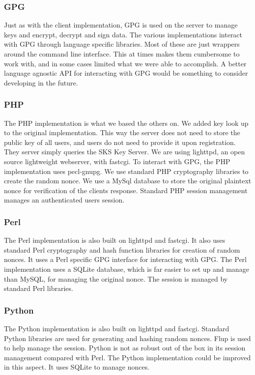 \documentclass[11pt]{article}
\begin{document}
\subsubsection{GPG}
Just as with the client implementation, GPG is used on the server to manage keys and encrypt, decrypt and sign data. The various implementations interact with GPG through language specific libraries. Most of these are just wrappers around the command line interface. This at times makes them cumbersome to work with, and in some cases limited what we were able to accomplish. A better language agnostic API for interacting with GPG would be something to consider developing in the future. 
\subsubsection{PHP}
The PHP implementation is what we based the others on. We added key look up to the original implementation. This way the server does not need to store the public key of all users, and users do not need to provide it upon registration. They server simply queries the SKS Key Server. We are using lighttpd, an open source lightweight webserver, with fastcgi. To interact with GPG, the PHP implementation uses pecl-gnupg. We use standard PHP cryptography libraries to create the random nonce. We use a MySql database to store the original plaintext nonce for verification of the clients response. Standard PHP session management manages an authenticated users session.
\subsubsection{Perl}
The Perl implementation is also built on lighttpd and fastcgi. It also uses standard Perl cryptography and hash function libraries for creation of random nonces. It uses a Perl specific GPG interface for interacting with GPG. The Perl implementation uses a SQLite database, which is far easier to set up and manage than MySQL, for managing the original nonce. The session is managed by standard Perl libraries.
\subsubsection{Python}
The Python implementation is also built on lighttpd and fastcgi. Standard Python libraries are used for generating and hashing random nonces. Flup is used to help manage the session. Python is not as robust out of the box in its session management compared with Perl. The Python implementation could be improved in this aspect. It uses SQLite to manage nonces.  
\end{document}

